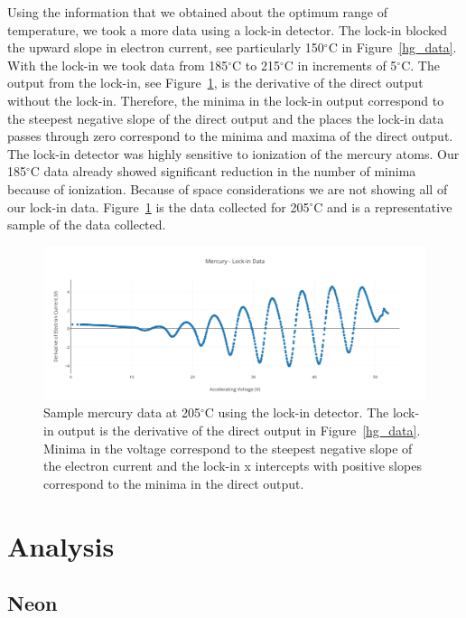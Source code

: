 \documentclass[prb,preprint]{revtex4-1}
\begin{document}
Using the information that we obtained about the optimum range of temperature, we took a more data using a lock-in detector. The lock-in blocked the upward slope in electron current, see particularly 150$^{\circ}$C in Figure~\ref{hg_data}. With the lock-in we took data from 185$^{\circ}$C to 215$^{\circ}$C in increments of 5$^{\circ}$C. The output from the lock-in, see Figure~\ref{hg_lockin}, is the derivative of the direct output without the lock-in. Therefore, the minima in the lock-in output correspond to the steepest negative slope of the direct output and the places the lock-in data passes through zero correspond to the minima and maxima of the direct output. The lock-in detector was highly sensitive to ionization of the mercury atoms. Our 185$^{\circ}$C data already showed significant reduction in the number of minima because of ionization. Because of space considerations we are not showing all of our lock-in data. Figure~\ref{hg_lockin} is the data collected for 205$^{\circ}$C and is a representative sample of the data collected.

\begin{figure}[h!]
\centering

\includegraphics[width=6in]{hg_lockin.pdf}
\caption{Sample mercury data at 205$^{\circ}$C using the lock-in detector. The lock-in output is the derivative of the direct output in Figure~\ref{hg_data}. Minima in the voltage correspond to the steepest negative slope of the electron current and the lock-in x intercepts with positive slopes correspond to the minima in the direct output.}

\label{hg_lockin}
\end{figure}



\section{Analysis}

\subsection{Neon}
\end{document}
